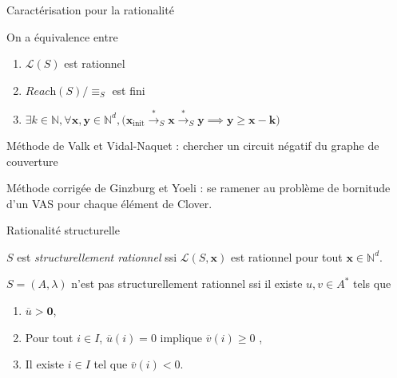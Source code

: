 \documentclass[french]{beamer}
\newcommand{\N}{\ensuremath{\mathbb{N}}}
\newcommand{\lang}{\ensuremath{\mathcal{L}}}
\newcommand{\reach}{\ensuremath{\textit{Reach}}}
\newcommand{\trans}[2]{\ensuremath{\stackrel{#1}{\longrightarrow}_{#2}}}
\newcommand{\vect}[1]{\ensuremath{\mathbf{#1}}}
\newcommand{\rel}{\ensuremath{\equiv}}
\newcommand{\xinit}{\ensuremath{\vect{x}_\text{init}}}
\newcommand{\valeur}[1]{\ensuremath{\overline{#1}}}
\let\oldemph\emph
\renewcommand{\emph}[1]{\oldemph{\color{blue}#1}}
\begin{document}
\begin{frame}{Caractérisation pour la rationalité}
\begin{theorem}
On a équivalence entre
\begin{enumerate}
    \item $\lang(S)$ est rationnel
    \item $\reach(S)/\rel_S$ est fini
    \item $\exists k\in\N, \forall \vect{x},\vect{y}\in\N^d, 
\big( \xinit\trans{*}{S} \vect{x} \trans{*}{S} \vect{y}\implies
\vect{y}\geq \vect{x} -\vect{k} \big)$
\end{enumerate}
\end{theorem}

\vspace{3mm}
Méthode de Valk et Vidal-Naquet : 
chercher un circuit négatif du graphe de couverture

Méthode corrigée de Ginzburg et Yoeli :
se ramener au problème de bornitude d'un VAS pour chaque élément de Clover. 
\end{frame}


\begin{frame}{Rationalité structurelle}
\begin{definition}
$S$ est \emph{structurellement rationnel} ssi $\lang(S,\vect{x})$ est rationnel pour tout $\vect{x} \in \N^d$.
\end{definition}

\begin{theorem}
$S=(A,\lambda)$ n'est pas structurellement rationnel ssi il existe $u,v\in A^*$ tels que 
\begin{enumerate}
    \item $\valeur{u} > \vect{0}$,
    \item Pour tout $i \in I$, $\valeur{u}(i)=0$ implique $\valeur{v}(i) \geq 0$ ,
    \item Il existe $i\in I$ tel que $\valeur{v}(i) < 0$.
\end{enumerate}
\end{theorem}
    
\end{frame}
\end{document}
